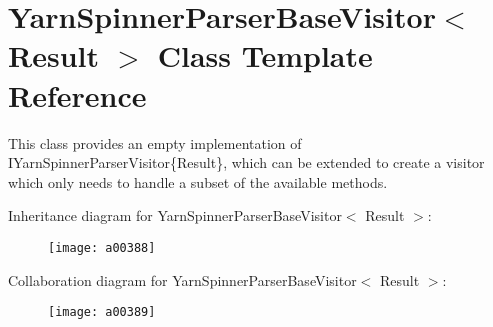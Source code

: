 \hypertarget{a00176}{\section{Yarn\-Spinner\-Parser\-Base\-Visitor$<$ Result $>$ Class Template Reference}
\label{a00176}
}


This class provides an empty implementation of I\-Yarn\-Spinner\-Parser\-Visitor\{\-Result\}, which can be extended to create a visitor which only needs to handle a subset of the available methods.  




Inheritance diagram for Yarn\-Spinner\-Parser\-Base\-Visitor$<$ Result $>$\-:
\nopagebreak
\begin{figure}[H]
\begin{center}
\leavevmode
\texttt{[image: a00388]}
\end{center}
\end{figure}


Collaboration diagram for Yarn\-Spinner\-Parser\-Base\-Visitor$<$ Result $>$\-:
\nopagebreak
\begin{figure}[H]
\begin{center}
\leavevmode
\texttt{[image: a00389]}
\end{center}
\end{figure}
